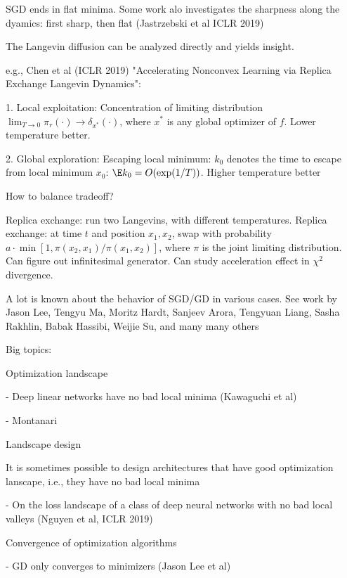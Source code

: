 \documentclass[english]{article}
\begin{document}
\item SGD ends in flat minima. Some work alo investigates the sharpness along the dyamics: first sharp, then flat (Jastrzebski et al ICLR 2019)

\item The Langevin diffusion can be analyzed directly and yields insight.

e.g., Chen et al (ICLR 2019) "Accelerating Nonconvex Learning via Replica Exchange Langevin Dynamics":

1. Local exploitation: Concentration of limiting distribution $\lim_{T\to0}\pi_r(\cdot)\to\delta_{x^*}(\cdot)$, where $x^*$ is any global optimizer of $f$. Lower temperature better.

2. Global exploration: Escaping local minimum: $k_0$ denotes the time to escape from local minimum $x_0$: $\E k_0 = O(\exp(1/T))$. Higher temperature better

How to balance tradeoff?

Replica exchange: run two Langevins, with different temperatures. Replica exchange: at time $t$ and position $x_1,x_2$, swap with probability $a\cdot \min [1, \pi(x_2,x_1)/\pi(x_1,x_2)]$, where $\pi$ is the joint limiting distribution. Can figure out infinitesimal generator. Can study acceleration effect in $\chi^2$ divergence.

\item A lot is known about the behavior of SGD/GD in various cases. See work by Jason Lee, Tengyu Ma, Moritz Hardt, Sanjeev Arora, Tengyuan Liang, Sasha Rakhlin, Babak Hassibi, Weijie Su, and many many others

Big topics: 

\benum 
\item 
Optimization landscape

- Deep linear networks have no bad local minima (Kawaguchi et al)

- Montanari

\item Landscape design

It is sometimes possible to design architectures that have good optimization lanscape, i.e., they have no bad local minima

- On the loss landscape of a class of deep neural networks with no bad local valleys (Nguyen et al, ICLR 2019)


\item Convergence of optimization algorithms

- GD only converges to minimizers (Jason Lee et al)
\end{document}
